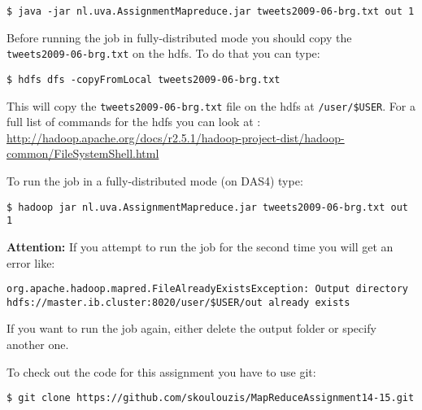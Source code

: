 \documentclass[a4paper,10pt]{article}
\begin{document}
\begin{lstlisting}
$ java -jar nl.uva.AssignmentMapreduce.jar tweets2009-06-brg.txt out 1 
\end{lstlisting}

Before running the job in fully-distributed mode you should copy the \texttt{tweets2009-06-brg.txt} on the hdfs. To do that you can type:

\begin{lstlisting}
$ hdfs dfs -copyFromLocal tweets2009-06-brg.txt
\end{lstlisting}

This will copy the \texttt{tweets2009-06-brg.txt} file on the hdfs at \texttt{/user/\$USER}. For a full list of commands for the hdfs you can look at : \url{http://hadoop.apache.org/docs/r2.5.1/hadoop-project-dist/hadoop-common/FileSystemShell.html}

To run the job in a fully-distributed mode (on DAS4) type: 
\begin{lstlisting}
$ hadoop jar nl.uva.AssignmentMapreduce.jar tweets2009-06-brg.txt out 1
\end{lstlisting}

\textbf{Attention:} If you attempt to run the job for the second time you will get an error like:
\begin{lstlisting}
org.apache.hadoop.mapred.FileAlreadyExistsException: Output directory hdfs://master.ib.cluster:8020/user/$USER/out already exists
\end{lstlisting}

If you want to run the job again, either delete the output folder or specify another one. 



To check out the code for this assignment you have to use git:
\begin{lstlisting}
$ git clone https://github.com/skoulouzis/MapReduceAssignment14-15.git
\end{lstlisting}
\end{document}
